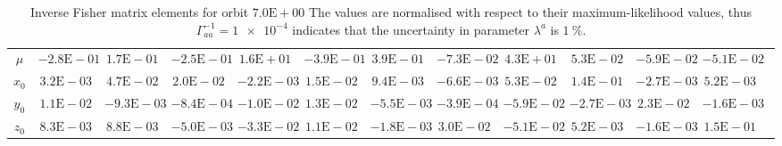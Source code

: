 \begin{sidewaystable}[htbp]
\begin{tabular}{cD{.}{.}{2.5}D{.}{.}{2.5}D{.}{.}{2.5}D{.}{.}{2.5}D{.}{.}{2.5}D{.}{.}{2.5}D{.}{.}{2.5}D{.}{.}{2.5}D{.}{.}{2.5}D{.}{.}{2.5}D{.}{.}{2.5}c}
$\mu$ & $-2.8\mathrm{E}-01$ & $1.7\mathrm{E}-01$ & $-2.5\mathrm{E}-01$ & $1.6\mathrm{E}+01$ & $-3.9\mathrm{E}-01$ & $3.9\mathrm{E}-01$ & $-7.3\mathrm{E}-02$ & $4.3\mathrm{E}+01$ & $5.3\mathrm{E}-02$ & $-5.9\mathrm{E}-02$ & $-5.1\mathrm{E}-02$ \\
$x_0$ & $3.2\mathrm{E}-03$ & $4.7\mathrm{E}-02$ & $2.0\mathrm{E}-02$ & $-2.2\mathrm{E}-03$ & $1.5\mathrm{E}-02$ & $9.4\mathrm{E}-03$ & $-6.6\mathrm{E}-03$ & $5.3\mathrm{E}-02$ & $1.4\mathrm{E}-01$ & $-2.7\mathrm{E}-03$ & $5.2\mathrm{E}-03$ \\
$y_0$ & $1.1\mathrm{E}-02$ & $-9.3\mathrm{E}-03$ & $-8.4\mathrm{E}-04$ & $-1.0\mathrm{E}-02$ & $1.3\mathrm{E}-02$ & $-5.5\mathrm{E}-03$ & $-3.9\mathrm{E}-04$ & $-5.9\mathrm{E}-02$ & $-2.7\mathrm{E}-03$ & $2.3\mathrm{E}-02$ & $-1.6\mathrm{E}-03$ \\
$z_0$ & $8.3\mathrm{E}-03$ & $8.8\mathrm{E}-03$ & $-5.0\mathrm{E}-03$ & $-3.3\mathrm{E}-02$ & $1.1\mathrm{E}-02$ & $-1.8\mathrm{E}-03$ & $3.0\mathrm{E}-02$ & $-5.1\mathrm{E}-02$ & $5.2\mathrm{E}-03$ & $-1.6\mathrm{E}-03$ & $1.5\mathrm{E}-01$
\bottomrule
\end{tabular}
\caption{Inverse Fisher matrix elements for orbit $7.0\mathrm{E}+00$ The values are normalised with respect to their maximum-likelihood values, thus $\Gamma^{-1}_{aa} = \num{1e-4}$ indicates that the uncertainty in parameter $\lambda^a$ is $\SI{1}{\percent}$.}
\label{tab:Fisher_7}
\end{sidewaystable}
